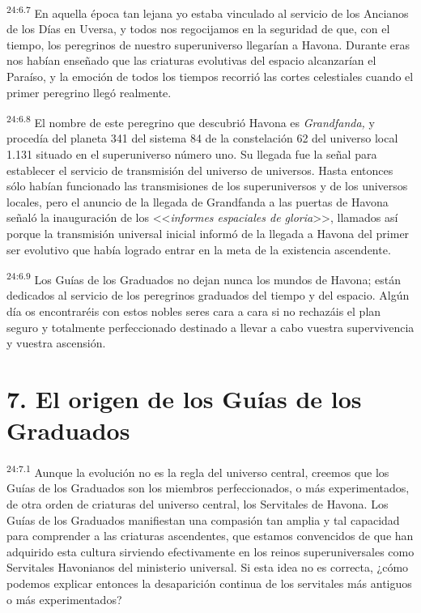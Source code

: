 \par
\textsuperscript{24:6.7} En aquella época tan lejana yo estaba vinculado al servicio de los Ancianos de los Días en Uversa, y todos nos regocijamos en la seguridad de que, con el tiempo, los peregrinos de nuestro superuniverso llegarían a Havona. Durante eras nos habían enseñado que las criaturas evolutivas del espacio alcanzarían el Paraíso, y la emoción de todos los tiempos recorrió las cortes celestiales cuando el primer peregrino llegó realmente.

\par
\textsuperscript{24:6.8} El nombre de este peregrino que descubrió Havona es \textit{Grandfanda,} y procedía del planeta 341 del sistema 84 de la constelación 62 del universo local 1.131 situado en el superuniverso número uno. Su llegada fue la señal para establecer el servicio de transmisión del universo de universos. Hasta entonces sólo habían funcionado las transmisiones de los superuniversos y de los universos locales, pero el anuncio de la llegada de Grandfanda a las puertas de Havona señaló la inauguración de los <<\textit{informes espaciales de gloria}>>, llamados así porque la transmisión universal inicial informó de la llegada a Havona del primer ser evolutivo que había logrado entrar en la meta de la existencia ascendente.

\par
\textsuperscript{24:6.9} Los Guías de los Graduados no dejan nunca los mundos de Havona; están dedicados al servicio de los peregrinos graduados del tiempo y del espacio. Algún día os encontraréis con estos nobles seres cara a cara si no rechazáis el plan seguro y totalmente perfeccionado destinado a llevar a cabo vuestra supervivencia y vuestra ascensión.

\section*{7. El origen de los Guías de los Graduados}
\par
\textsuperscript{24:7.1} Aunque la evolución no es la regla del universo central, creemos que los Guías de los Graduados son los miembros perfeccionados, o más experimentados, de otra orden de criaturas del universo central, los Servitales de Havona. Los Guías de los Graduados manifiestan una compasión tan amplia y tal capacidad para comprender a las criaturas ascendentes, que estamos convencidos de que han adquirido esta cultura sirviendo efectivamente en los reinos superuniversales como Servitales Havonianos del ministerio universal. Si esta idea no es correcta, ¿cómo podemos explicar entonces la desaparición continua de los servitales más antiguos o más experimentados?

